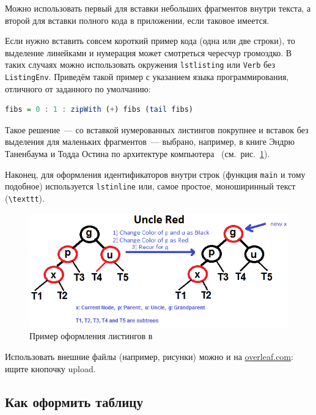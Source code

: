 Можно использовать первый для вставки небольших фрагментов
внутри текста, а второй для вставки полного
кода в приложении, если таковое имеется.

Если нужно вставить совсем короткий пример кода (одна или две строки), то выделение  линейками и нумерация может смотреться чересчур громоздко. В таких случаях можно использовать окружения \texttt{lstlisting} или \texttt{Verb} без \texttt{ListingEnv}. Приведём такой пример с указанием языка программирования, отличного от заданного по умолчанию:
\begin{lstlisting}[language=Haskell]
fibs = 0 : 1 : zipWith (+) fibs (tail fibs)
\end{lstlisting}
Такое решение~--- со вставкой нумерованных листингов покрупнее
и вставок без выделения для маленьких фрагментов~--- выбрано,
например, в книге Эндрю Таненбаума и Тодда Остина по архитектуре
компьютера~\autocite{TanAus2013} (см.~рис.~\ref{fig:tan-aus}).

Наконец, для оформления идентификаторов внутри строк
(функция \lstinline{main} и тому подобное) используется
\texttt{lstinline} или, самое простое, моноширинный текст
(\texttt{\textbackslash texttt}).

\begin{figure}[p]%
\centering
\includegraphics[width=\textwidth]{img/tan-aus.png}
\caption{\label{fig:tan-aus}Пример оформления листингов в~\autocite{TanAus2013}}
\end{figure}

Использовать внешние файлы (например, рисунки) можно и на \href{http://overleaf.com}{overleaf.com}: ищите кнопочку upload.

\subsection{Как оформить таблицу}

